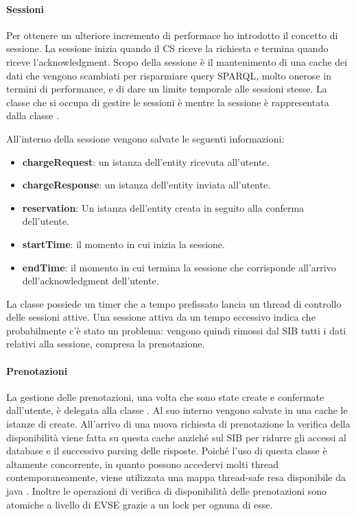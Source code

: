 \paragraph{Sessioni}

Per ottenere un ulteriore incremento di performace ho introdotto il concetto di sessione. La sessione inizia quando il CS riceve la richiesta e termina quando riceve l'acknowledgment. Scopo della sessione è il mantenimento di una cache dei dati che vengono scambiati per risparmiare query SPARQL, molto onerose in termini di performance, e di dare un limite temporale alle sessioni stesse. La classe che si occupa di gestire le sessioni è  mentre la sessione è rappresentata dalla classe .

All'interno della sessione vengono salvate le seguenti informazioni:

\begin{itemize}
	\item \textbf{chargeRequest}: un istanza dell'entity  ricevuta all'utente. 
	\item \textbf{chargeResponse}: un istanza dell'entity  inviata all'utente. 
	\item \textbf{reservation}: Un istanza dell'entity  creata in seguito alla conferma dell'utente.
	\item \textbf{startTime}: il momento in cui inizia la sessione.
	\item \textbf{endTime}: il momento in cui termina la sessione che corrisponde all'arrivo dell'acknowledgment dell'utente.
\end{itemize}

\noindent
La classe  possiede un timer che a tempo prefissato lancia un thread di controllo delle sessioni attive. Una sessione attiva da un tempo eccessivo indica che probabilmente c'è stato un problema: vengono quindi rimossi dal SIB tutti i dati relativi alla sessione, compresa la prenotazione.

\paragraph{Prenotazioni}

La gestione delle prenotazioni, una volta che sono state create e confermate dall'utente, è delegata alla classe . Al suo interno vengono salvate in una cache le istanze di  create. All'arrivo di una nuova richiesta di prenotazione la verifica della disponibilità viene fatta su questa cache anziché sul SIB per ridurre gli accessi al database e il successivo parsing delle risposte.
Poiché l'uso di questa classe è altamente concorrente, in quanto possono accedervi molti thread contemporaneamente, viene utilizzata una mappa thread-safe resa disponibile da java . Inoltre le operazioni di verifica di disponibilità delle prenotazioni sono atomiche a livello di EVSE grazie a un lock per ognuna di esse. 

